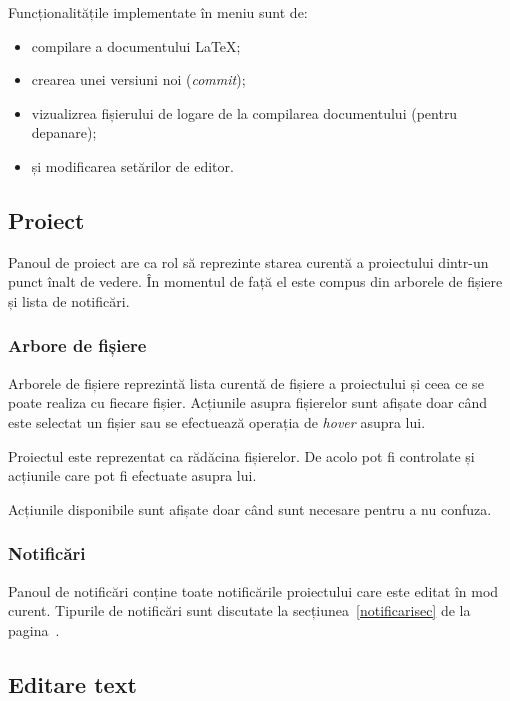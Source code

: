 \documentclass[a4wide,12pt]{report}
\newcommand{\eng}[1]{\emph{#1}} %
\begin{document}
Funcționalitățile implementate în meniu sunt de:

\begin{itemize}

\item compilare a documentului \LaTeX{};

\item crearea unei versiuni noi (\eng{commit});

\item vizualizrea fișierului de logare de la compilarea documentului (pentru
depanare);

\item și modificarea setărilor de editor.

\end{itemize}

\subsection{Proiect}

Panoul de proiect are ca rol să reprezinte starea curentă a proiectului dintr-un
punct înalt de vedere. În momentul de față el este compus din arborele de
fișiere și lista de notificări.

\subsubsection{Arbore de fișiere}

Arborele de fișiere reprezintă lista curentă de fișiere a proiectului și ceea ce
se poate realiza cu fiecare fișier. Acțiunile asupra fișierelor sunt afișate
doar când este selectat un fișier sau se efectuează operația de \eng{hover}
asupra lui.

Proiectul este reprezentat ca rădăcina fișierelor. De acolo pot fi controlate și
acțiunile care pot fi efectuate asupra lui.

Acțiunile disponibile sunt afișate doar când sunt necesare pentru a nu confuza.

\subsubsection{Notificări}

Panoul de notificări conține toate notificările proiectului care este editat în
mod curent. Tipurile de notificări sunt discutate la
secțiunea~\ref{notificarisec} de la pagina~\pageref{notificarisec}.

\subsection{Editare text}
\end{document}
